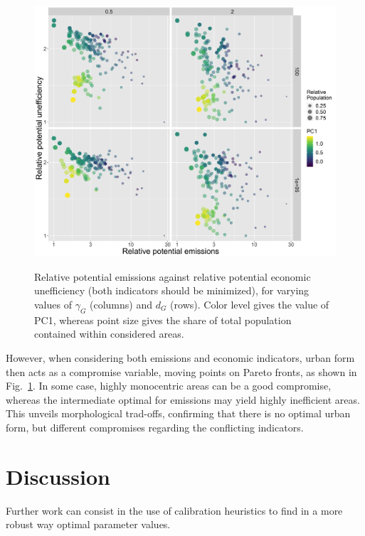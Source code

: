 \documentclass{jimis-en}
\begin{document}
\begin{figure}[ht] 
  {\includegraphics[width=\linewidth]{figures/aggreg_morpho_relemissions-relefficiency_colpc1_logscale_targeted.png}}
  \centering  
  \caption{Relative potential emissions against relative potential economic unefficiency (both indicators should be minimized), for varying values of $\gamma_G$ (columns) and $d_G$ (rows). Color level gives the value of PC1, whereas point size gives the share of total population contained within considered areas.\label{fig:paretos-relative}}
\end{figure}


However, when considering both emissions and economic indicators, urban form then acts as a compromise variable, moving points on Pareto fronts, as shown in Fig.~\ref{fig:paretos-relative}. In some case, highly monocentric areas can be a good compromise, whereas the intermediate optimal for emissions may yield highly inefficient areas. This unveils morphological trad-offs, confirming that there is no optimal urban form, but different compromises regarding the conflicting indicators.





\section{Discussion}

Further work can consist in the use of calibration heuristics \citep{reuillon2013openmole} to find in a more robust way optimal parameter values.
\end{document}

